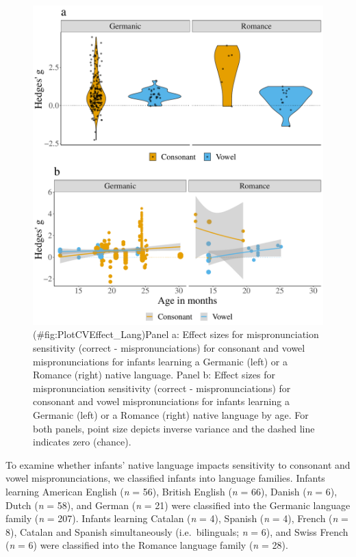 \documentclass[man]{apa6}
\begin{document}
\begin{figure}
\centering
\includegraphics{VonHolzenBergmann_MPMetaAnalysis_files/figure-latex/PlotCVEffect_Lang-1.pdf}
\caption{(\#fig:PlotCVEffect\_Lang)Panel a: Effect sizes for mispronunciation sensitivity (correct - mispronunciations) for consonant and vowel mispronunciations for infants learning a Germanic (left) or a Romance (right) native language. Panel b: Effect sizes for mispronunciation sensitivity (correct - mispronunciations) for consonant and vowel mispronunciations for infants learning a Germanic (left) or a Romance (right) native language by age. For both panels, point size depicts inverse variance and the dashed line indicates zero (chance).}
\end{figure}

To examine whether infants' native language impacts sensitivity to consonant and vowel mispronunciations, we classified infants into language families. Infants learning American English (\emph{n} = 56), British English (\emph{n} = 66), Danish (\emph{n} = 6), Dutch (\emph{n} = 58), and German (\emph{n} = 21) were classified into the Germanic language family (\emph{n} = 207). Infants learning Catalan (\emph{n} = 4), Spanish (\emph{n} = 4), French (\emph{n} = 8), Catalan and Spanish simultaneously (i.e.~bilinguals; \emph{n} = 6), and Swiss French (\emph{n} = 6) were classified into the Romance language family (\emph{n} = 28).
\end{document}
